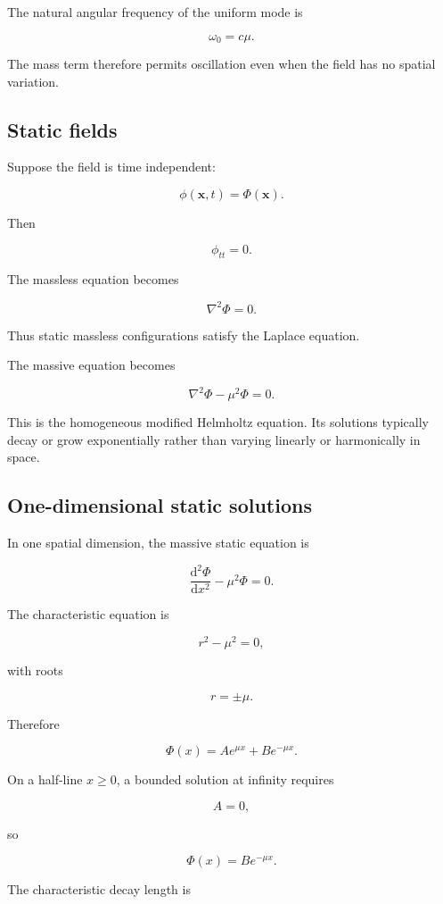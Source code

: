 The natural angular frequency of the uniform mode is

\[
\boxed{
\omega_{0}=c\mu
}.
\]

The mass term therefore permits oscillation even when the field has no spatial variation.

\subsection{Static fields}

Suppose the field is time independent:

\[
\phi(\mathbf{x},t)=\Phi(\mathbf{x}).
\]

Then

\[
\phi_{tt}=0.
\]

The massless equation becomes

\[
\boxed{
\nabla^{2}\Phi=0
}.
\]

Thus static massless configurations satisfy the Laplace equation.

The massive equation becomes

\[
\boxed{
\nabla^{2}\Phi
-
\mu^{2}\Phi
=0
}.
\]

This is the homogeneous modified Helmholtz equation. Its solutions typically decay or grow exponentially rather than varying linearly or harmonically in space.

\subsection{One-dimensional static solutions}

In one spatial dimension, the massive static equation is

\[
\frac{\mathrm{d}^{2}\Phi}{\mathrm{d}x^{2}}
-
\mu^{2}\Phi
=0.
\]

The characteristic equation is

\[
r^{2}-\mu^{2}=0,
\]

with roots

\[
r=\pm\mu.
\]

Therefore

\[
\boxed{
\Phi(x)
=
A e^{\mu x}
+
B e^{-\mu x}
}.
\]

On a half-line \(x\geq0\), a bounded solution at infinity requires

\[
A=0,
\]

so

\[
\boxed{
\Phi(x)=B e^{-\mu x}
}.
\]

The characteristic decay length is

